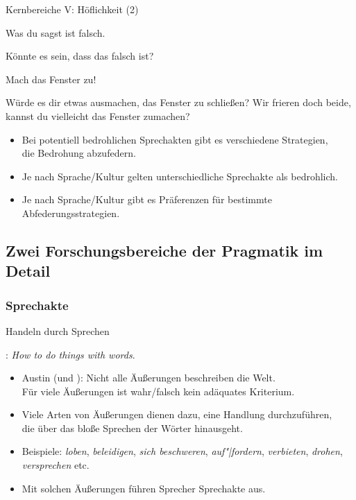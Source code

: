 \begin{frame}{Kernbereiche V: Höflichkeit (2)}

\begin{exe}
  \ex Was du sagst ist falsch.
  \begin{xlist}
   \ex \alert{Könnte} es sein, dass das falsch ist\alert{?}
  \end{xlist}
  \ex Mach das Fenster zu! 
  \begin{xlist}
    \ex \alert{Würde es dir etwas ausmachen}, das Fenster zu schließen\alert{?}
    \ex \alert{Wir frieren doch beide}, kannst du \alert{vielleicht} das Fenster zumachen\alert{?}
  \end{xlist}
\end{exe}


\begin{itemize}[<+->]
\item Bei potentiell bedrohlichen Sprechakten gibt es verschiedene Strategien,\\
      die Bedrohung abzufedern.
   \item Je nach Sprache/Kultur gelten unterschiedliche Sprechakte als bedrohlich.
   \item Je nach Sprache/Kultur gibt es Präferenzen für bestimmte Abfederungsstrategien. 
\end{itemize}

\end{frame}




\subsection{Zwei Forschungsbereiche der Pragmatik im Detail} 

\subsubsection{Sprechakte}


\begin{frame}{Handeln durch Sprechen}

\cite{Austin1962}: \textit{How to do things with words}.

\begin{itemize}[<+->]
\item Austin (und ): Nicht alle Äußerungen beschreiben die Welt.\\
      Für viele Äußerungen ist wahr/falsch kein adäquates Kriterium.
\item Viele Arten von Äußerungen dienen dazu, eine Handlung durchzuführen,\\
       die über das bloße Sprechen der Wörter hinausgeht.
\item Beispiele: \emph{loben}, \emph{beleidigen}, \emph{sich beschweren}, \emph{auf"|fordern}, \emph{verbieten}, \emph{drohen}, \emph{versprechen} etc.
\item Mit solchen Äußerungen führen Sprecher \alert{Sprechakte} aus.
\end{itemize}
\end{frame}




